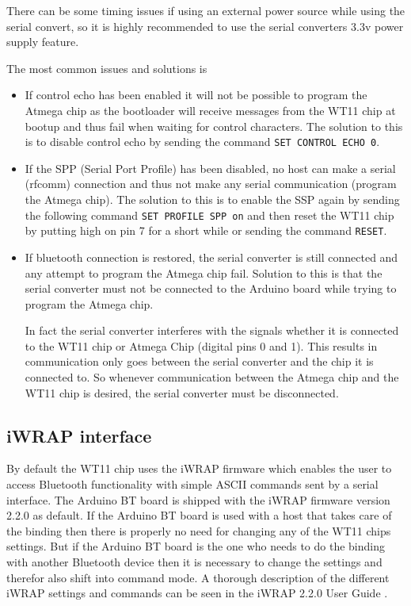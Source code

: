 \documentclass[a4paper, oneside, final]{memoir}
\begin{document}
There can be some timing issues if using an external power source while using
the serial convert, so it is highly recommended to use the serial converters
3.3v power supply feature.

The most common issues and solutions is

\begin{itemize}
\item If control echo has been enabled it will not be possible to program the
  Atmega chip as the bootloader will receive messages from the WT11 chip at
  bootup and thus fail when waiting for control characters. The solution to this
  is to disable control echo by sending the command \texttt{SET CONTROL ECHO 0}.

\item If the SPP (Serial Port Profile) has been disabled, no host can make a
  serial (rfcomm) connection and thus not make any serial communication (program
  the Atmega chip). The solution to this is to enable the SSP again by sending
  the following command \texttt{SET PROFILE SPP on} and then reset the WT11 chip
  by putting high on pin 7 for a short while or sending the command
  \texttt{RESET}.

\item If bluetooth connection is restored, the serial converter is still
  connected and any attempt to program the Atmega chip fail. Solution to this is
  that the serial converter must not be connected to the Arduino board while
  trying to program the Atmega chip. 

  In fact the serial converter interferes with the signals whether it is
  connected to the WT11 chip or Atmega Chip (digital pins 0 and 1). This results
  in communication only goes between the serial converter and the chip it is
  connected to. So whenever communication between the Atmega chip and the WT11
  chip is desired, the serial converter must be disconnected.
\end{itemize}

\subsection{iWRAP interface}

By default the WT11 chip uses the iWRAP firmware which enables the user to
access Bluetooth functionality with simple ASCII commands sent by a serial
interface. The Arduino BT board is shipped with the iWRAP firmware version 2.2.0
as default. If the Arduino BT board is used with a host that takes care of the
binding then there is properly no need for changing any of the WT11 chips
settings. But if the Arduino BT board is the one who needs to do the binding
with another Bluetooth device then it is necessary to change the settings and
therefor also shift into command mode. A thorough description of the different
iWRAP settings and commands can be seen in the iWRAP 2.2.0 User
Guide \cite{iWRAP220UG}.
\end{document}
